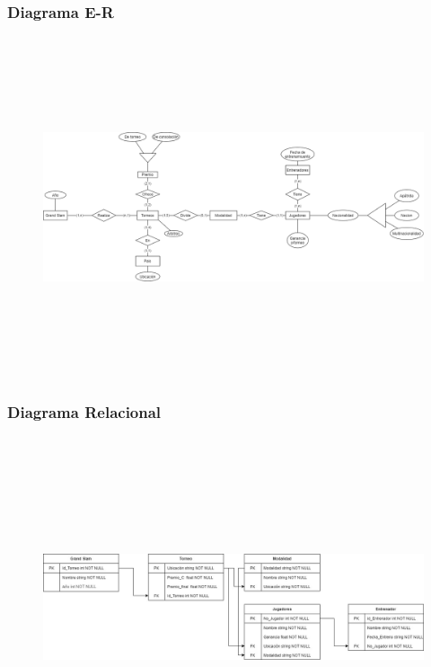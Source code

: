 \documentclass[a4paper, 12pt]{article}
\begin{document}
\begin{justify}
        \subsubsection{Diagrama E-R}
        \begin{figure}[H]
            \centering
            \includegraphics[width=16cm,height=10cm]{er9.png}
        \end{figure}
        \subsubsection{Diagrama Relacional}
        \begin{figure}[H]
            \centering
            \includegraphics[width=16cm,height=10cm]{rel9.jpg}
        \end{figure}

\end{justify}
\end{document}
